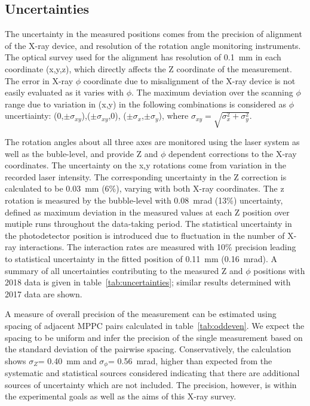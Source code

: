 \subsection{Uncertainties}\label{sec:uncertainties}
The uncertainty in the measured positions comes from the
precision of alignment of the X-ray device, and resolution of the
rotation angle monitoring instruments. The optical survey used
for the alignment has resolution of 0.1~mm in each coordinate
(x,y,z), which directly affects the Z coordinate of the
measurement. The error in X-ray $\phi$ coordinate due to
misalignment of the X-ray device is not easily evaluated as it
varies with $\phi$.  The maximum deviation over the scanning
$\phi$ range due to variation in (x,y) in the following
combinations is  considered as $\phi$ uncertiainty:
(0,$\pm\sigma_{xy}$),($\pm\sigma_{xy}$,0),
($\pm\sigma_{x}$,$\pm\sigma_{y}$), where $\sigma_{xy} =
\sqrt{\sigma_{x}^{2}+\sigma_{y}^2}$.

The rotation angles about all three axes are monitored using the
laser system as well as the buble-level, and provide Z and $\phi$
dependent corrections to the X-ray coordinates.  The uncertainty
on the x,y rotations come from variation in the recorded laser
intensity.  The corresponding uncertainty in the Z correction is
calculated to be 0.03~mm (6\%), varying with both X-ray
coordinates.  The z rotation is measured by the bubble-level with
0.08~mrad (13\%) uncertainty, defined as maximum deviation in the
measured values at each Z position  over mutiple runs throughout
the data-taking period.  The statistical uncertainty in the
photodetector position is introduced due to fluctuation in the
number of X-ray interactions. The interaction rates are measured
with 10\% precision leading to statistical uncertainty in the
fitted position of  0.11~mm (0.16~mrad).  A summary of all
uncertainties contributing to the measured Z and $\phi$ positions
with 2018 data is given in table~\ref{tab:uncertainties}; similar
results determined with 2017 data are shown.

A measure of overall precision of the measurement can be
estimated using spacing of adjacent MPPC pairs calculated in
table~\ref{tab:oddeven}.  We expect the spacing to be uniform and
infer the precision of the single measurement based on the
standard deviation of the pairwise spacing. Conservatively, the
calculation shows $\sigma_Z$= 0.40~mm and $\sigma_\phi$=
0.56~mrad, higher than expected from the systematic and
statistical sources considered indicating that there are
additional sources of uncertainty which are not included. The
precision, however, is within the experimental goals as well as
the aims of this X-ray survey.

